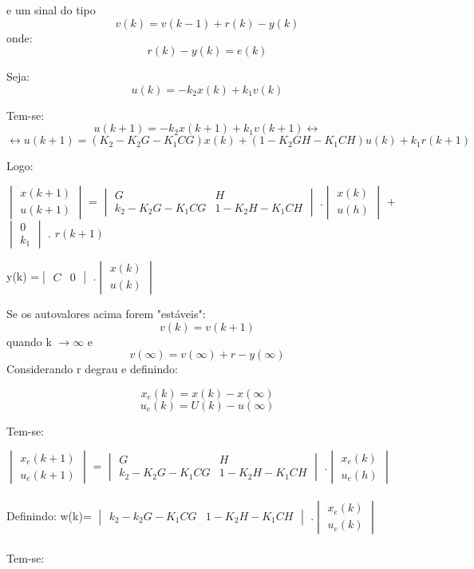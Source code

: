 \documentclass[a4paper,12pt]{article}
\begin{document}
e um sinal do tipo 
$$v(k)=v(k-1)+r(k)-y(k)$$ 
onde:$$r(k)-y(k)=e(k)$$

Seja: $$u(k)=-k_{2}x(k)+k_{1}v(k)$$

Tem-se:
$$u(k+1)=-k_{2}x(k+1)+k_{1}v(k+1)\leftrightarrow $$
$$\leftrightarrow u(k+1)=(K_{2}-K_{2}G-K_{1}CG)x(k)+(1-K_{2}GH-K_{1}CH)u(k)+k_{1}r(k+1)$$

Logo:


$
\begin{vmatrix}
x(k+1)\\
u(k+1)
\end{vmatrix}
$
= $
\begin{vmatrix}
G& H\\
k_{2}-K_{2}G-K_{1}CG & 1-K_{2}H-K_{1}CH
\end{vmatrix}
$
.$
\begin{vmatrix}
x(k) \\
u(h)
\end{vmatrix}
$
+
$
\begin{vmatrix}
0\\
k_{1}
\end{vmatrix}
$
. $r(k+1)$ 


y(k) =$
\begin{vmatrix}
C &    0
\end{vmatrix}
$
.$
\begin{vmatrix}
x(k)\\
u(k)
\end{vmatrix}
$

Se os autovalores acima forem "estáveis":
$$v(k)=v(k+1) $$ quando k $\rightarrow \infty$ e
$$v(\infty)=v(\infty)+r-y(\infty)$$
Considerando r degrau e definindo:

$$x_{e}(k)=x(k)-x(\infty)$$
$$u_{e}(k)=U(k)-u(\infty)$$

Tem-se:

$
\begin{vmatrix}
x_{e}(k+1)\\
u_{e}(k+1)
\end{vmatrix}
$
= $
\begin{vmatrix}
G& H\\
k_{2}-K_{2}G-K_{1}CG & 1-K_{2}H-K_{1}CH
\end{vmatrix}
$
.$
\begin{vmatrix}
x_{e}(k) \\
u_{e}(h)
\end{vmatrix}
$
\\
\\

Definindo:
w(k)=
$	
\begin{vmatrix}
k_{2}-k_{2}G-K_{1}CG & 1-K_{2}H-K_{1}CH
\end{vmatrix}
$
.$
\begin{vmatrix}
x_{e}(k)\\		
u_{e}(k)
\end{vmatrix}
$
\\
\\
Tem-se:
\end{document}
